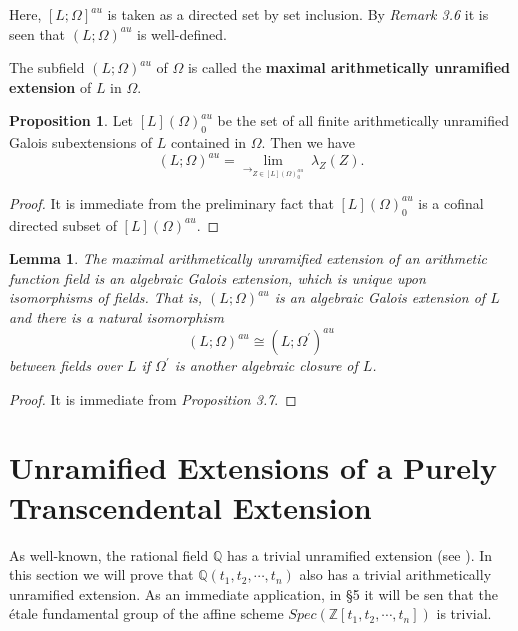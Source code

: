 \documentclass{amsart}
\newtheorem{lemma}[theorem]{Lemma}
\theoremstyle{definition}
\newtheorem{proposition}[theorem]{Proposition}
\numberwithin{equation}{section}
\begin{document}
Here, $\left[ L;\Omega \right]^{au}$ is taken as a directed set by set
inclusion. By \emph{Remark 3.6} it is seen that $(L;\Omega)^{au}$ is
well-defined.

The subfield $(L;\Omega)^{au}$ of $\Omega$ is called the \textbf{maximal
arithmetically unramified extension} of $L$ in $\Omega$.


\begin{proposition}
Let $\left[ L \right](\Omega)^{au}_{0}$ be the set of all finite
arithmetically unramified Galois subextensions of $L$ contained in $\Omega$.
Then we have
\begin{equation*}
(L;\Omega)^{au}= {{\lim}_{\rightarrow_{Z\in {\left[ L \right](\Omega)^{au}_{0}}}}}{\ \lambda_{Z}(Z)}.
\end{equation*}
\end{proposition}

\begin{proof}
It is immediate from the preliminary fact that $\left[ L \right](\Omega)^{au}_{0}$ is a cofinal directed subset of $\left[ L \right](\Omega)^{au}$.
\end{proof}

\begin{lemma}
The maximal arithmetically unramified extension of an arithmetic function field is an algebraic Galois extension, which is unique upon isomorphisms of fields. That is,
$(L;\Omega)^{au}$ is an algebraic Galois extension of $L$ and there is a natural isomorphism $$(L;\Omega)^{au}\cong (L;\Omega^{\prime})^{au}$$ between fields over $L$ if $\Omega^{\prime}$ is another algebraic closure of $L$.
\end{lemma}

\begin{proof}
It is immediate from \emph{Proposition 3.7}.
\end{proof}

\section{Unramified Extensions of a Purely Transcendental Extension}

As well-known, the rational field $\mathbb{Q}$ has a trivial unramified extension (see \cite{neu}). In this section we will prove that $\mathbb{Q}(t_{1},t_{2},\cdots,t_{n})$ also has a trivial arithmetically unramified extension.
As an immediate application, in \S 5 it will be sen that the \'{e}tale fundamental group of the affine scheme $Spec(\mathbb{Z}[t_{1},t_{2},\cdots,t_{n}])$ is trivial.
\end{document}
